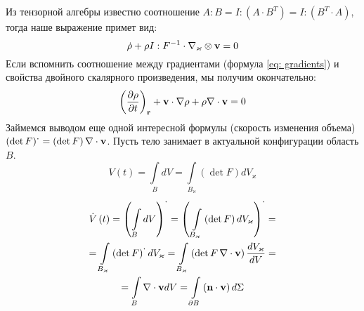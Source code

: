 \documentclass[a4papper, 14pt]{book}
\renewcommand{\kappa}{\ensuremath{\varkappa}}
\newcommand{\diad}{\ensuremath\otimes}
\newcommand{\mf}[1]{\ensuremath\mathbf{#1}}
\theoremstyle{plain} %
\theoremstyle{definition} %
\theoremstyle{remark} %
\begin{document}
	Из тензорной алгебры известно соотношение $A:B = I:\left(A\cdot B^T \right) =I:\left(B^T \cdot A\right)$, тогда наше выражение примет вид:
	$$
	\dot{\rho} + \rho I : F^{-1}\cdot\nabla_{\kappa}\diad\mf{v} = 0
	$$
	Если вспомнить соотношение между градиентами (формула \eqref{eq: gradients}) и свойства двойного скалярного произведения, мы получим окончательно:
	\begin{equation}
	\left(\dfrac{\partial\rho}{\partial t}\right)_{\mf{r}} + \mf{v}\cdot\nabla\rho + 	\rho\nabla\cdot\mf{v} = 0
	\end{equation}
	Займемся выводом еще одной интересной формулы (скорость изменения объема) $\left(\det F \right)^{\displaystyle .} = \left(\det F \right)\nabla\cdot \mf{v}$. Пусть тело занимает в актуальной конфигурации область $B$. 
	\begin{equation}
	V\left(t\right) = \int\limits_B dV = \int\limits_{B_{\kappa}} \left(\det F \right) dV_{\kappa}
	\end{equation}
	\begin{multline}
	\dot{V}\left(t\right) = \left(\int\limits_B dV\right)^{\displaystyle\cdot} = \left(\,\int\limits_{B_{\kappa}} \left(\det F \right) dV_{\kappa}\right)^{\displaystyle\cdot } =\\
	= \int\limits_{B_{\kappa}} \left(\det F \right)^{\displaystyle\cdot } dV_{\kappa} = \int\limits_{B_{\kappa}} \left(\det F\, \nabla\cdot\mf{v}\right) \dfrac{dV_{\kappa}}{dV} =\\ 
	= \int\limits_B \nabla\cdot\mf{v} dV = \int\limits_{\partial B} \left(\mf{n}\cdot\mf{v}\right) d\Sigma
	\end{multline}
	\def\thesubsection{\arabic{section}.\arabic{subsection}}
\end{document}
